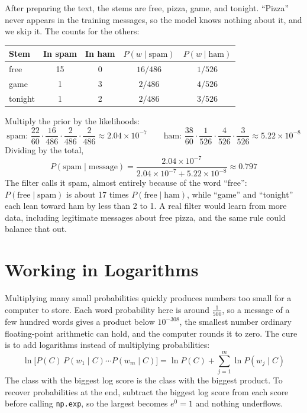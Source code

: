 After preparing the text, the stems are free, pizza, game, and tonight. ``Pizza'' never appears in the
training messages, so the model knows nothing about it, and we skip it. The counts for the others:

\begin{center}
\begin{tabular}{l c c c c}
\textbf{Stem} & \textbf{In spam} & \textbf{In ham} & $P(w \mid \text{spam})$ & $P(w \mid \text{ham})$ \\
\hline
free & 15 & 0 & $16/486$ & $1/526$ \\
game & 1 & 3 & $2/486$ & $4/526$ \\
tonight & 1 & 2 & $2/486$ & $3/526$ \\
\end{tabular}
\end{center}

Multiply the prior by the likelihoods:
$$\text{spam: } \frac{22}{60} \cdot \frac{16}{486} \cdot \frac{2}{486} \cdot \frac{2}{486} \approx 2.04 \times 10^{-7}
\qquad
\text{ham: } \frac{38}{60} \cdot \frac{1}{526} \cdot \frac{4}{526} \cdot \frac{3}{526} \approx 5.22 \times 10^{-8}$$
Dividing by the total,
$$P(\text{spam} \mid \text{message}) = \frac{2.04 \times 10^{-7}}{2.04 \times 10^{-7} + 5.22 \times 10^{-8}} \approx 0.797$$
The filter calls it spam, almost entirely because of the word ``free'': $P(\text{free} \mid \text{spam})$ is about 17 times
$P(\text{free} \mid \text{ham})$, while ``game'' and ``tonight'' each lean toward ham by less than 2 to 1. A real filter would learn
from more data, including legitimate messages about free pizza, and the same rule could balance that out.

\section{Working in Logarithms}
Multiplying many small probabilities quickly produces numbers too small for a computer to store. Each word
probability here is around $\frac{1}{500}$, so a message of a few hundred words gives a product below
$10^{-308}$, the smallest number ordinary floating-point arithmetic can hold, and the computer rounds it to
zero. The cure is to add logarithms
instead of multiplying probabilities:
$$\ln\big[P(C)\,P(w_1 \mid C) \cdots P(w_m \mid C)\big] = \ln P(C) + \sum_{j=1}^{m} \ln P(w_j \mid C)$$
The class with the biggest log score is the class with the biggest product. To recover probabilities at the
end, subtract the biggest log score from each score before calling \verb|np.exp|, so the largest becomes
$e^0 = 1$ and nothing underflows.

